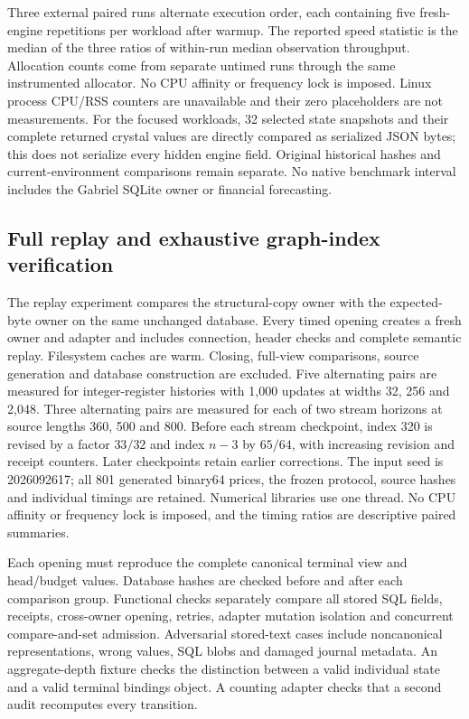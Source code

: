 \documentclass[11pt,a4paper]{article}
\theoremstyle{definition}\newtheorem{definition}[theorem]{Definition}
\begin{document}
Three external paired runs alternate execution order, each containing five fresh-engine repetitions per workload after warmup. The reported speed statistic is the median of the three ratios of within-run median observation throughput. Allocation counts come from separate untimed runs through the same instrumented allocator. No CPU affinity or frequency lock is imposed. Linux process CPU/RSS counters are unavailable and their zero placeholders are not measurements. For the focused workloads, 32 selected state snapshots and their complete returned crystal values are directly compared as serialized JSON bytes; this does not serialize every hidden engine field. Original historical hashes and current-environment comparisons remain separate. No native benchmark interval includes the Gabriel SQLite owner or financial forecasting.

\subsection{Full replay and exhaustive graph-index verification}\label{sec:indexprotocol}
The replay experiment compares the structural-copy owner with the expected-byte owner on the same unchanged database. Every timed opening creates a fresh owner and adapter and includes connection, header checks and complete semantic replay. Filesystem caches are warm. Closing, full-view comparisons, source generation and database construction are excluded. Five alternating pairs are measured for integer-register histories with 1,000 updates at widths 32, 256 and 2,048. Three alternating pairs are measured for each of two stream horizons at source lengths 360, 500 and 800. Before each stream checkpoint, index 320 is revised by a factor $33/32$ and index $n-3$ by $65/64$, with increasing revision and receipt counters. Later checkpoints retain earlier corrections. The input seed is 2026092617; all 801 generated binary64 prices, the frozen protocol, source hashes and individual timings are retained. Numerical libraries use one thread. No CPU affinity or frequency lock is imposed, and the timing ratios are descriptive paired summaries.

Each opening must reproduce the complete canonical terminal view and head/budget values. Database hashes are checked before and after each comparison group. Functional checks separately compare all stored SQL fields, receipts, cross-owner opening, retries, adapter mutation isolation and concurrent compare-and-set admission. Adversarial stored-text cases include noncanonical representations, wrong values, SQL blobs and damaged journal metadata. An aggregate-depth fixture checks the distinction between a valid individual state and a valid terminal bindings object. A counting adapter checks that a second audit recomputes every transition.
\end{document}

